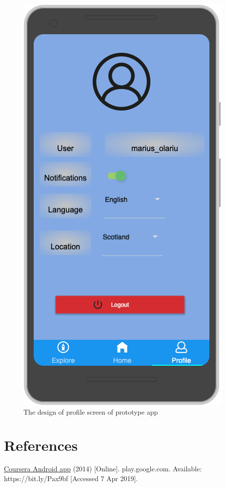 \documentclass[version=last,fontsize=13pt]{scrartcl}
\begin{document}
		\begin{figure}[H]

			\centering	
			\includegraphics[scale = 0.45]{./imgs/prototype/profileSc}
			\caption{The design of profile screen of prototype app}
			\label{pE}

		\end{figure}



\newpage

\section*{References}
\underline{Coursera Android app} (2014) [Online]. play.google.com. Available: https://bit.ly/Pax9bf [Accessed 7 Apr 2019].\\
\end{document}
